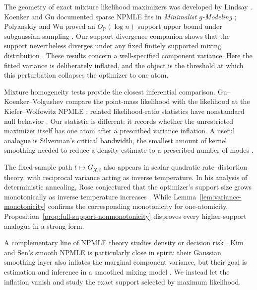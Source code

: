 \documentclass[11pt]{article}
\theoremstyle{definition}
\numberwithin{equation}{section}
\begin{document}
The geometry of exact mixture likelihood maximizers was developed by Lindsay
\cite{lindsay1983geometryA}. Koenker and Gu documented sparse NPMLE fits in
\emph{Minimalist $g$-Modeling} \cite{koenker2019minimalist}; Polyanskiy and Wu
proved an \(O_{\mathbb P}(\log n)\) support upper bound under subgaussian
sampling \cite{polyanskiy2020self}. Our support-divergence companion shows
that the support nevertheless diverges under any fixed finitely supported
mixing distribution \cite{supportDivergenceCompanion}. These results concern
a well-specified component variance. Here the fitted variance is deliberately
inflated, and the object is the threshold at which this perturbation collapses
the optimizer to one atom.

Mixture homogeneity tests provide the closest inferential comparison.
Gu--Koenker--Volgushev compare the point-mass likelihood with the likelihood
at the Kiefer--Wolfowitz NPMLE \cite{guKoenkerVolgushev2018}; related
likelihood-ratio statistics have nonstandard null behavior
\cite{hartigan1985failure,azais2009likelihood,jiangZhang2019rate}.
Our statistic is different: it records whether the unrestricted maximizer
itself has one atom after a prescribed variance inflation. A useful analogue
is Silverman's critical bandwidth, the smallest amount of kernel smoothing
needed to reduce a density estimate to a prescribed number of modes
\cite{silverman1981multimodality,hallYork2001calibration}.

The fixed-sample path \(t\mapsto\widehat G_{X,t}\) also appears in scalar
quadratic rate--distortion theory, with reciprocal variance acting as inverse
temperature. In his analysis of deterministic annealing, Rose conjectured
that the optimizer's support size grows monotonically as inverse temperature
increases \cite[Section~IV-C, p.~1946]{rose1994mapping}.
While Lemma~\ref{lem:variance-monotonicity} confirms the corresponding
monotonicity for one-atomicity,
Proposition~\ref{prop:full-support-nonmonotonicity} disproves every
higher-support analogue in a strong form.

A complementary line of NPMLE theory studies density or decision risk
\cite{zhang2009generalized,saha2020nonparametric,doss2020optimal}.
Kim and Sen's smooth NPMLE is particularly close in spirit: their Gaussian
smoothing layer also inflates the marginal component variance, but their goal
is estimation and inference in a smoothed mixing model
\cite{KimSen2026SmoothNPMLE}. We instead let the inflation vanish and study
the exact support selected by maximum likelihood.
\end{document}
